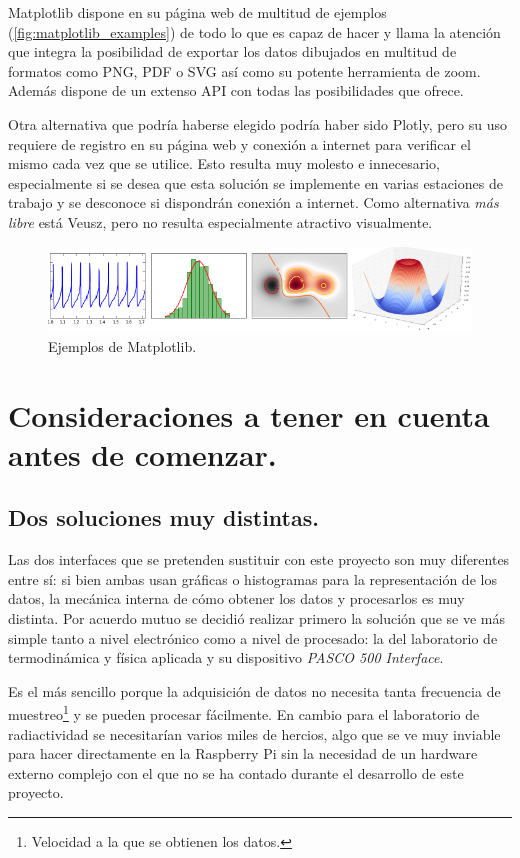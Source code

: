	Matplotlib dispone en su página web\cite{matplotlib_home} de multitud de ejemplos (\autoref{fig:matplotlib_examples}) de todo lo que es capaz de hacer y llama la atención que integra la posibilidad de exportar los datos dibujados en multitud de formatos como PNG, PDF o SVG así como su potente herramienta de zoom. Además dispone de un extenso API con todas las posibilidades que ofrece.
	
	Otra alternativa que podría haberse elegido podría haber sido Plotly, pero su uso requiere de registro en su página web y conexión a internet para verificar el mismo cada vez que se utilice. Esto resulta muy molesto e innecesario, especialmente si se desea que esta solución se implemente en varias estaciones de trabajo y se desconoce si dispondrán conexión a internet. Como alternativa \emph{más libre} está Veusz, pero no resulta especialmente atractivo visualmente.
	
\begin{figure}[hb]
  \centering
  \includegraphics[width=1\textwidth]{img/matplotlib-caps.png}
  \caption{Ejemplos de Matplotlib.}\label{fig:matplotlib_examples}
\end{figure}
\section{Consideraciones a tener en cuenta antes de comenzar.}

\subsection{Dos soluciones muy distintas.}
	Las dos interfaces que se pretenden sustituir con este proyecto son muy diferentes entre sí: si bien ambas usan gráficas o histogramas para la representación de los datos, la mecánica interna de cómo obtener los datos y procesarlos es muy distinta. Por acuerdo mutuo se decidió realizar primero la solución que se ve más simple tanto a nivel electrónico como a nivel de procesado: la del laboratorio de termodinámica y física aplicada y su dispositivo \emph{PASCO 500 Interface}.
	
	Es el más sencillo porque la adquisición de datos no necesita tanta frecuencia de muestreo\footnote{Velocidad a la que se obtienen los datos.} y se pueden procesar fácilmente. En cambio para el laboratorio de radiactividad se necesitarían varios miles de hercios, algo que se ve muy inviable para hacer directamente en la Raspberry Pi sin la necesidad de un hardware externo complejo con el que no se ha contado durante el desarrollo de este proyecto. 
	
